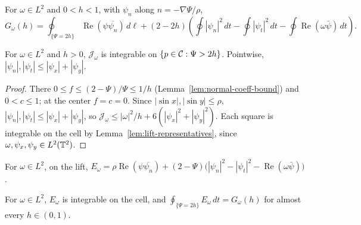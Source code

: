 \begin{definition}
\label{def:ee-level-term}
\leanok
For $\omega\in L^2$ and $0<h<1$, with $\psi_n$ along $n=-\nabla\Psi/\rho$,
\[
  G_\omega(h)=\oint_{\{\Psi=2h\}}\operatorname{Re}(\psi\overline{\psi_n})\,d\ell
   +(2-2h)\left(\oint|\psi_n|^2\,dt-\oint|\psi_t|^2\,dt
     -\oint\operatorname{Re}(\omega\bar\psi)\,dt\right).
\]
\end{definition}

\begin{lemma}
\label{lem:ee-bulk-integrable}
\leanok
For $\omega\in L^2$ and $h>0$, $\mathcal J_\omega$ is integrable on $\{p\in\mathcal{C}:\Psi>2h\}$.
Pointwise, $|\psi_n|,|\psi_t|\le|\psi_x|+|\psi_y|$.
\end{lemma}

\begin{proof}
\leanok
There $0\le f\le(2-\Psi)/\Psi\le1/h$ (Lemma~\ref{lem:normal-coeff-bound}) and $0<c\le1$; at
the center $f=c=0$. Since $|\sin x|,|\sin y|\le\rho$, $|\psi_n|,|\psi_t|\le|\psi_x|+|\psi_y|$, so
$\mathcal J_\omega\le|\omega|^2/h+6(|\psi_x|^2+|\psi_y|^2)$. Each square is integrable on the cell
by Lemma~\ref{lem:lift-representatives}, since $\omega,\psi_x,\psi_y\in L^2(\mathbb{T}^2)$.
\end{proof}

\begin{definition}
\label{def:ee-boundary-density}
\leanok
For $\omega\in L^2$, on the lift,
$E_\omega=\rho\operatorname{Re}(\psi\overline{\psi_n})+(2-\Psi)\bigl(|\psi_n|^2-|\psi_t|^2
-\operatorname{Re}(\omega\bar\psi)\bigr)$.
\end{definition}

\begin{lemma}
\label{lem:ee-boundary-integrable}
\leanok
For $\omega\in L^2$, $E_\omega$ is integrable on the cell, and
$\oint_{\{\Psi=2h\}}E_\omega\,dt=G_\omega(h)$ for almost every $h\in(0,1)$.
\end{lemma}

